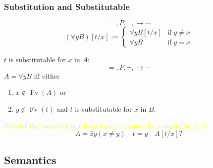 \documentclass[UTF8,aspectratio=43,11pt,colorlinks,compress,openany]{beamer}%
\begin{document}
\begin{frame}\frametitle{Substitution and Substitutable}
\setlength\abovedisplayskip{0pt}
\setlength\belowdisplayskip{0pt}
	\begin{definition}
		\[=,P,\neg,\to\cdots\]
		\[(\forall y B)[t/x]:=
			\begin{cases}
			\forall y B[t/x] &\text{if}\;y\ne x\\
			\forall y B &\text{if}\;y=x
			\end{cases}\]
	\end{definition}
	\begin{definition}[Substitutable]
		$t$ is substitutable for $x$ in $A$:
		\[=,P,\neg,\to\cdots\]
		$A=\forall y B$ iff either
		\begin{enumerate}
			\item $x\notin \operatorname{Fv}(A)$ or
			\item $y\notin \operatorname{Fv}(t)$ and $t$ is substitutable for $x$ in $B$.
		\end{enumerate}
	\end{definition}
\textcolor{yellow}{Prevent the variables in $t$ from being captured by a quantifier in $A$.}
	\[A=\exists y(x\ne y)\quad t=y\quad A[t/x]?\]
\end{frame}

\subsection{Semantics}
\end{document}
